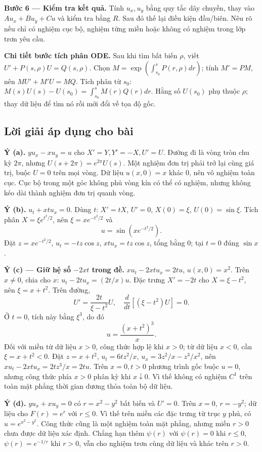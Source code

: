 \documentclass[10pt,a4paper]{article}
\begin{document}
\textbf{Bước 6 — Kiểm tra kết quả.} Tính $u_x,u_y$ bằng quy tắc dây chuyền, thay vào $Au_x+Bu_y+Cu$ và kiểm tra bằng $R$. Sau đó thế lại điều kiện đầu/biên. Nêu rõ nếu chỉ có nghiệm cục bộ, nghiệm từng miền hoặc không có nghiệm trong lớp trơn yêu cầu.

\textbf{Chi tiết bước tích phân ODE.} Sau khi tìm bất biến $\rho$, viết $U'+P(s,\rho)U=Q(s,\rho)$. Chọn $M=\exp(\int_{s_0}^{s}P(r,\rho)dr)$; tính $M'=PM$, nên $MU'+M'U=MQ$. Tích phân từ $s_0$: $M(s)U(s)-U(s_0)=\int_{s_0}^sM(r)Q(r)dr$. Hằng số $U(s_0)$ phụ thuộc $\rho$; thay dữ liệu để tìm nó rồi mới đổi về tọa độ gốc.
\subsection*{Lời giải áp dụng cho bài}
\textbf{Ý (a).} $yu_x-xu_y=u$ cho $X'=Y,Y'=-X,U'=U$. Đường đi là vòng tròn chu kỳ $2\pi$, nhưng $U(s+2\pi)=e^{2\pi}U(s)$. Một nghiệm đơn trị phải trở lại cùng giá trị, buộc $U=0$ trên mọi vòng. Dữ liệu $u(x,0)=x$ khác 0, nên vô nghiệm toàn cục. Cục bộ trong một góc không phủ vòng kín có thể có nghiệm, nhưng không kéo dài thành nghiệm đơn trị quanh vòng.

\textbf{Ý (b).} $u_t+xtu_x=0$. Dùng $t$: $X'=tX$, $U'=0$, $X(0)=\xi$, $U(0)=\sin\xi$. Tích phân $X=\xi e^{t^2/2}$, nên $\xi=xe^{-t^2/2}$ và
\[u=\sin(xe^{-t^2/2}).\]
Đặt $z=xe^{-t^2/2}$, $u_t=-tz\cos z$, $xtu_x=tz\cos z$, tổng bằng 0; tại $t=0$ đúng $\sin x$.

\textbf{Ý (c) — Giữ hệ số $-2xt$ trong đề.} $xu_t-2xtu_x=2tu$, $u(x,0)=x^2$. Trên $x\ne0$, chia cho $x$: $u_t-2tu_x=(2t/x)u$. Đặc trưng $X'= -2t$ cho $X=\xi-t^2$, nên $\xi=x+t^2$. Trên đường,
\[U'=\frac{2t}{\xi-t^2}U,\quad \frac{d}{dt}[(\xi-t^2)U]=0.\]
Ở $t=0$, tích này bằng $\xi^3$, do đó
\[u=\frac{(x+t^2)^3}{x}.\]
Đối với miền từ dữ liệu $x>0$, công thức hợp lệ khi $x>0$; từ dữ liệu $x<0$, cần $\xi=x+t^2<0$. Đặt $z=x+t^2$, $u_t=6tz^2/x$, $u_x=3z^2/x-z^3/x^2$, nên $xu_t-2xtu_x=2tz^3/x=2tu$. Trên $x=0,t>0$ phương trình gốc buộc $u=0$, nhưng công thức phía $x>0$ phân kỳ khi $x\downarrow0$. Vì thế không có nghiệm $C^1$ trên toàn mặt phẳng thời gian dương thỏa toàn bộ dữ liệu.

\textbf{Ý (d).} $yu_x+xu_y=0$ có $r=x^2-y^2$ bất biến và $U'=0$. Trên $x=0$, $r=-y^2$; dữ liệu cho $F(r)=e^r$ với $r\le0$. Vì thế trên miền các đặc trưng từ trục $y$ phủ, có $u=e^{x^2-y^2}$. Công thức cũng là một nghiệm toàn mặt phẳng, nhưng miền $r>0$ chưa được dữ liệu xác định. Chẳng hạn thêm $\psi(r)$ với $\psi(r)=0$ khi $r\le0$, $\psi(r)=e^{-1/r}$ khi $r>0$, vẫn cho nghiệm trơn cùng dữ liệu và khác trên $r>0$.
\end{document}
